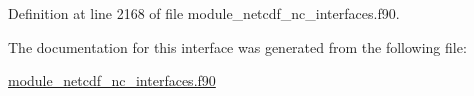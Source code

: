 Definition at line 2168 of file module\+\_\+netcdf\+\_\+nc\+\_\+interfaces.\+f90.



The documentation for this interface was generated from the following file\+:\begin{DoxyCompactItemize}
\item 
\hyperlink{module__netcdf__nc__interfaces_8f90}{module\+\_\+netcdf\+\_\+nc\+\_\+interfaces.\+f90}\end{DoxyCompactItemize}

